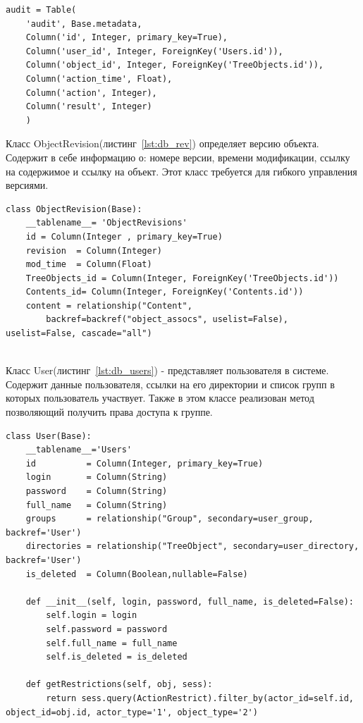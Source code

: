 \documentclass[utf8,usehyperref,12pt]{G7-32}
\begin{document}
\lstset{language=Python,caption=Таблица аудита,label=lst:db_audit}
\begin{lstlisting} 
audit = Table(
    'audit', Base.metadata,    
    Column('id', Integer, primary_key=True),
    Column('user_id', Integer, ForeignKey('Users.id')),
    Column('object_id', Integer, ForeignKey('TreeObjects.id')),
    Column('action_time', Float),
    Column('action', Integer),
    Column('result', Integer)
    )
\end{lstlisting}

Класс ObjectRevision(листинг~\ref{lst:db_rev}) определяет версию объекта. Содержит в себе информацию о: номере версии, времени модификации, ссылку на содержимое и ссылку на объект. Этот класс требуется для гибкого управления версиями.

\lstset{language=Python,caption=Таблица версий,label=lst:db_rev}
\begin{lstlisting} 
class ObjectRevision(Base):
    __tablename__= 'ObjectRevisions'
    id = Column(Integer , primary_key=True)
    revision  = Column(Integer)
    mod_time  = Column(Float)
    TreeObjects_id = Column(Integer, ForeignKey('TreeObjects.id'))
    Contents_id= Column(Integer, ForeignKey('Contents.id'))
    content = relationship("Content", 
    	backref=backref("object_assocs", uselist=False), uselist=False, cascade="all")
    
\end{lstlisting}

Класс User(листинг~\ref{lst:db_users}) - представляет пользователя в системе. Содержит данные пользователя, ссылки на его директории и список групп в которых пользователь участвует. Также в этом классе реализован метод позволяющий получить права доступа к группе.

\lstset{language=Python,caption=Таблица пользователей,label=lst:db_users}
\begin{lstlisting}         
class User(Base):
    __tablename__='Users'
    id          = Column(Integer, primary_key=True)
    login       = Column(String)
    password    = Column(String)
    full_name   = Column(String)
    groups      = relationship("Group", secondary=user_group, backref='User')
    directories = relationship("TreeObject", secondary=user_directory, backref='User')
    is_deleted  = Column(Boolean,nullable=False)
    
    def __init__(self, login, password, full_name, is_deleted=False):
        self.login = login
        self.password = password
        self.full_name = full_name
        self.is_deleted = is_deleted
    
    def getRestrictions(self, obj, sess):        
        return sess.query(ActionRestrict).filter_by(actor_id=self.id, object_id=obj.id, actor_type='1', object_type='2')
\end{lstlisting}
\end{document}
